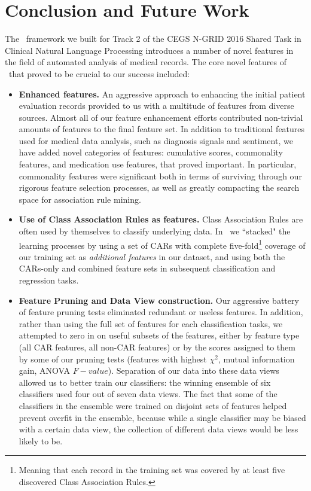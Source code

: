 \chapter{Conclusion and Future Work}\label{sec:conclusion}


The \CREATE\ framework we built for Track 2 of the CEGS N-GRID 2016 Shared Task in Clinical Natural Language Processing introduces a number of novel features in the
field of automated analysis of medical records. The core novel
features of \CREATE\ that proved to be crucial to our success included:

\begin{itemize}
\item \textbf{Enhanced features.} An aggressive approach to enhancing the
initial patient evaluation records provided to us with a multitude of features
from diverse sources. Almost all of our feature enhancement efforts 
contributed non-trivial amounts of features to the final feature set. In addition
to traditional features used for medical data analysis, such as diagnosis signals and sentiment, we have added novel categories of features: cumulative scores, commonality
features, and medication use features, that proved important. In particular, commonality features were significant both in terms of surviving through our rigorous feature selection processes, as well as greatly compacting the search space for association rule mining. 

\item \textbf{Use of Class Association Rules as features.} Class Association Rules
are often used by themselves to classify underlying data. In \CREATE\ we ``stacked"
the learning processes by using a set of CARs with complete five-fold\footnote{Meaning
that each record in the training set was covered by at least five discovered
Class Association Rules.} coverage of our training set as \textit{additional features} 
in our dataset, and using both the CARs-only and combined feature sets in
subsequent classification and regression tasks.

\item \textbf{Feature Pruning and Data View construction.} Our aggressive
battery of feature pruning tests eliminated redundant or useless features.
In addition, rather than using the full set of features for each classification
tasks, we attempted to zero in on useful subsets of the features, either by
feature type (all CAR features, all non-CAR features) or by the scores
assigned to them by some of our pruning tests (features with highest
$\chi^2$, mutual information gain, ANOVA $F-value$). Separation of our
data into these data views allowed us to better train our classifiers:
the winning ensemble of six classifiers used four out of seven data views.
The fact that some of the classifiers in the ensemble were trained
on disjoint sets of features helped prevent overfit in the ensemble, because while
a single classifier may be biased with a certain data view, the collection
of different data views would be less likely to be.


\end{itemize}
